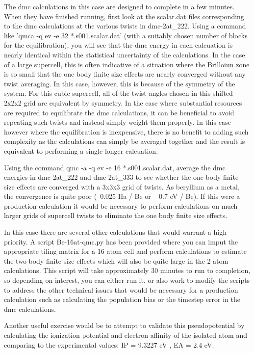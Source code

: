 The dmc calculations in this case are designed to complete in a few minutes.  When they have finished running, first look at the scalar.dat files corresponding to the dmc calculations at the various twists in dmc-2at\_222.  Using a command like 'qmca -q ev -e 32 *.s001.scalar.dat' (with a suitably chosen number of blocks for the equilibration), you will see that the dmc energy in each calcuation is nearly identical within the statistical uncertainty of the calculations.  In the case of a large supercell, this is often indicative of a situation where the Brilloiun zone is so small that the one body finite size effects are nearly converged without any twist averaging.  In this case, however, this is because of the symmetry of the system.  For this cubic supercell, all of the twist angles chosen in this shifted 2x2x2 grid are equivalent by symmetry.  In the case where substantial resources are required to equilibrate the dmc calculations, it can be beneficial to avoid repeating such twists and instead simply weight them properly.  In this case however where the equilibration is inexpensive, there is no benefit to adding such complexity as the calculations can simply be averaged together and the result is equivalent to performing a single longer calcuation.

Using the command qmc -a -q ev -e 16 *.s001.scalar.dat, average the dmc energies in dmc-2at\_222 and dmc-2at\_333 to see whether the one body finite size effects are converged with a 3x3x3 grid of twists.  As beryllium as a metal, the convergence is quite poor (~0.025 Ha / Be or ~ 0.7 eV / Be).  If this were a production calculation it would be necessary to perform calculations on much larger grids of supercell twists to eliminate the one body finite size effects.

In this case there are several other calculations that would warrant a high priority.  A script Be-16at-qmc.py has been provided where you can imput the appropriate tiling matrix for a 16 atom cell and perform calculations to estimate the two body finite size effects which will also be quite large in the 2 atom calculations.  This script will take approximately 30 minutes to run to completion, so depending on interest,  you can either run it, or also work to modify the scripts to address the other technical issues that would be necessary for a production calculation such as calculating the population bias or the timestep error in the dmc calculations.  

Another useful exercise would be to attempt to validate this pseudopotential by calculating the ionization potential and electron affinity of the isolated atom and comparing to the experimental values:  IP = 9.3227 eV , EA = 2.4 eV.

